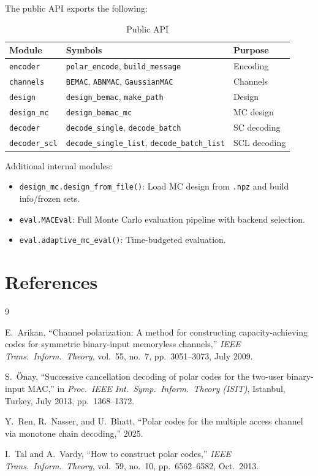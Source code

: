 \documentclass[11pt,a4paper]{article}
\begin{document}
The public API exports the following:

\begin{table}[h]
\centering
\caption{Public API}
\begin{tabular}{lll}
\toprule
\textbf{Module} & \textbf{Symbols} & \textbf{Purpose} \\
\midrule
\texttt{encoder} & \texttt{polar\_encode}, \texttt{build\_message} & Encoding \\
\texttt{channels} & \texttt{BEMAC}, \texttt{ABNMAC}, \texttt{GaussianMAC} & Channels \\
\texttt{design} & \texttt{design\_bemac}, \texttt{make\_path} & Design \\
\texttt{design\_mc} & \texttt{design\_bemac\_mc} & MC design \\
\texttt{decoder} & \texttt{decode\_single}, \texttt{decode\_batch} & SC decoding \\
\texttt{decoder\_scl} & \texttt{decode\_single\_list}, \texttt{decode\_batch\_list} & SCL decoding \\
\bottomrule
\end{tabular}
\end{table}

Additional internal modules:
\begin{itemize}
  \item \texttt{design\_mc.design\_from\_file()}: Load MC design from \texttt{.npz} and build info/frozen sets.
  \item \texttt{eval.MACEval}: Full Monte Carlo evaluation pipeline with backend selection.
  \item \texttt{eval.adaptive\_mc\_eval()}: Time-budgeted evaluation.
\end{itemize}


\section{References}
\label{sec:references}

\begin{thebibliography}{9}

E.~Arikan, ``Channel polarization: A method for constructing
capacity-achieving codes for symmetric binary-input memoryless channels,''
\emph{IEEE Trans.\ Inform.\ Theory}, vol.~55, no.~7, pp.~3051--3073, July 2009.

S.~\"{O}nay, ``Successive cancellation decoding of polar codes for the
two-user binary-input MAC,''
in \emph{Proc.\ IEEE Int.\ Symp.\ Inform.\ Theory (ISIT)}, Istanbul, Turkey,
July 2013, pp.~1368--1372.

Y.~Ren, R.~Nasser, and U.~Bhatt, ``Polar codes for the multiple access
channel via monotone chain decoding,''
2025.

I.~Tal and A.~Vardy, ``How to construct polar codes,''
\emph{IEEE Trans.\ Inform.\ Theory}, vol.~59, no.~10, pp.~6562--6582,
Oct.\ 2013.

\end{thebibliography}
\end{document}
